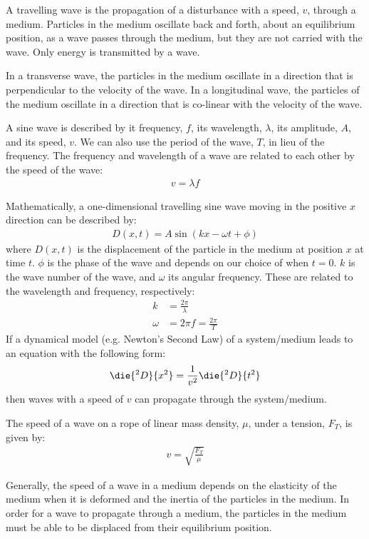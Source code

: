 \begin{chapterSummary}
A travelling wave is the propagation of a disturbance with a speed, $v$, through a medium. Particles in the medium oscillate back and forth, about an equilibrium position, as a wave passes through the medium, but they are not carried with the wave. Only energy is transmitted by a wave.

In a transverse wave, the particles in the medium oscillate in a direction that is perpendicular to the velocity of the wave. In a longitudinal wave, the particles of the medium oscillate in a direction that is co-linear with the velocity of the wave.

A sine wave is described by it frequency, $f$, its wavelength, $\lambda$, its amplitude, $A$, and its speed, $v$. We can also use the period of the wave, $T$, in lieu of the frequency. The frequency and wavelength of a wave are related to each other by the speed of the wave:
\begin{align*}
v = \lambda f
\end{align*}

Mathematically, a one-dimensional travelling sine wave moving in the positive $x$ direction can be described by:
\begin{align*}
D(x,t) = A \sin(kx-\omega t + \phi)
\end{align*}
where $D(x,t)$ is the displacement of the particle in the medium at position $x$ at time $t$. $\phi$ is the phase of the wave and depends on our choice of when $t=0$. $k$ is the wave number of the wave, and $\omega$ its angular frequency. These are related to the wavelength and frequency, respectively:
\begin{align*}
k &= \frac{2\pi}{\lambda}\\
\omega &= 2\pi f = \frac{2\pi}{T}
\end{align*}
If a dynamical model (e.g. Newton's Second Law) of a system/medium leads to an equation with the following form:
\begin{align*}
\die{^2D}{x^2}=\frac{1}{v^2}\die{^2D}{t^2}
\end{align*}
then waves with a speed of $v$ can propagate through the system/medium.

The speed of a wave on a rope of linear mass density, $\mu$, under a tension, $F_T$, is given by:
\begin{align*}
v=\sqrt{\frac{F_T}{\mu}}
\end{align*}

Generally, the speed of a wave in a medium depends on the elasticity of the medium when it is deformed and the inertia of the particles in the medium. In order for a wave to propagate through a medium, the particles in the medium must be able to be displaced from their equilibrium position.


\end{chapterSummary}

